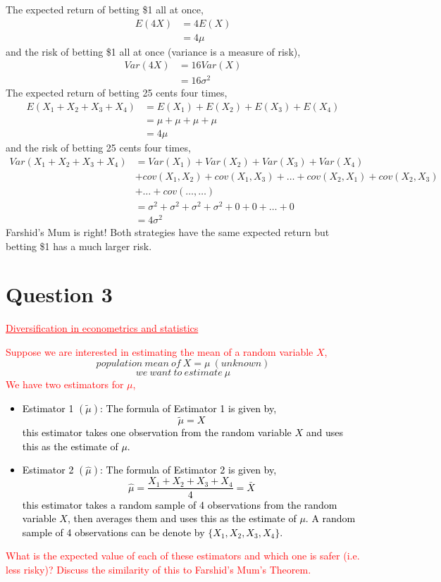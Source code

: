 \documentclass[12pt]{report}
\begin{document}
\noindent The expected return of betting \$1 all at once,
\begin{align*}
	E(4X)&=4E(X) \\
	&=4\mu 
\end{align*} \noindent and the risk of betting \$1 all at once (variance is a measure of risk),
\begin{align*}
Var(4X)&=16Var(X) \\
&=16\sigma^2
\end{align*} \noindent The expected return of betting 25 cents four times,
\begin{align*}
E(X_1+X_2+X_3+X_4)&=E(X_1)+E(X_2)+E(X_3)+E(X_4) \\
&=\mu+\mu+\mu+\mu \\
&=4\mu
\end{align*}
\noindent and the risk of betting 25 cents four times,
\begin{align*}
Var(X_1+X_2+X_3+X_4)&=Var(X_1)+Var(X_2)+Var(X_3)+Var(X_4) \\
&+cov(X_1,X_2)+cov(X_1,X_3)+\dots + cov(X_2, X_1) + cov(X_2, X_3) \\
&+ \dots + cov(\dots,\dots)  \\
&=\sigma^2+\sigma^2+\sigma^2+\sigma^2+0+0+\dots+0 \\
&=4\sigma^2
\end{align*}
\noindent Farshid's Mum is right! Both strategies have the same expected return but betting \$1 has a much larger risk. 

\newpage
\section*{Question 3}
\textcolor{red}{\underline{Diversification in econometrics and statistics}}

\noindent \textcolor{red}{Suppose we are interested in estimating the mean of a random variable $X$,}
\noindent $$population\ mean\ of\ X = \mu\ (unknown)$$
\noindent $$we\ want\ to\ estimate\ \mu$$
\noindent \textcolor{red}{We have two estimators for $\mu$,}
\noindent \textcolor{black}{\begin{itemize}
		\item Estimator 1 $(\tilde{\mu})$: The formula of Estimator 1 is given by, $$\tilde{\mu} = X$$  this estimator takes one observation from the random variable $X$ and uses this as the estimate of $\mu$. 
		\item Estimator 2 $(\hat{\mu})$: The formula of Estimator 2 is given by, $$\hat{\mu} = \dfrac{X_1+X_2+X_3+X_4}{4} = \bar{X}$$ this estimator takes a random sample of 4 observations from the random variable $X$, then averages them and uses this as the estimate of $\mu$. A random sample of 4 observations can be denote by $\{X_1,X_2,X_3,X_4\}$. 
	\end{itemize}}
\noindent \textcolor{red}{What is the expected value of each of these estimators and which one is safer (i.e. less risky)? Discuss the similarity of this to Farshid's Mum's Theorem.}
\end{document}
